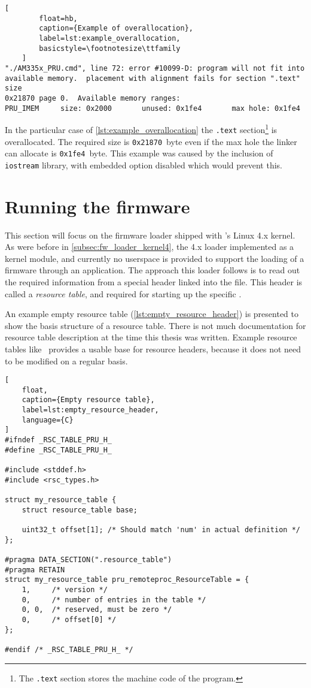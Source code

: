 \begin{lstlisting}[
		float=hb,
		caption={Example of overallocation},
		label=lst:example_overallocation,
		basicstyle=\footnotesize\ttfamily
	]
"./AM335x_PRU.cmd", line 72: error #10099-D: program will not fit into
available memory.  placement with alignment fails for section ".text" size
0x21870 page 0.  Available memory ranges:
PRU_IMEM     size: 0x2000       unused: 0x1fe4       max hole: 0x1fe4
\end{lstlisting}

In the particular case of \cref{lst:example_overallocation} the \verb|.text| section\footnote{The \verb|.text| section stores the machine code of the program.} is overallocated. The required size is \verb|0x21870|\ byte even if the max hole the linker can allocate is \verb|0x1fe4|\ byte. This example was caused by the inclusion of \verb|iostream| library, with embedded \cpp{} option disabled which would prevent this.

\section{Running the firmware}

This section will focus on the firmware loader shipped with \ti{}'s Linux 4.x kernel. As were before in \cref{subsec:fw_loader_kernel4}, the 4.x loader implemented as a kernel module, and currently no userspace \api{} is provided to support the loading of a \pru{} firmware through an application. The approach this loader follows is to read out the required information from a special header linked into the \elf{} file. This header is called a \emph{resource table}, and required for starting up the specific \pru{}.

An example empty resource table (\cref{lst:empty_resource_header}) is presented to show the basis structure of a resource table. There is not much documentation for resource table description at the time this thesis was written. Example resource tables like~\cite{RESOURCE_TABLE_0}\cite{RESOURCE_TABLE_1} provides a usable base for resource headers, because it does not need to be modified on a regular basis.

\begin{lstlisting}[
	float,
	caption={Empty resource table},
	label=lst:empty_resource_header,
	language={C}
]
#ifndef _RSC_TABLE_PRU_H_
#define _RSC_TABLE_PRU_H_

#include <stddef.h>
#include <rsc_types.h>

struct my_resource_table {
	struct resource_table base;

	uint32_t offset[1]; /* Should match 'num' in actual definition */
};

#pragma DATA_SECTION(".resource_table")
#pragma RETAIN
struct my_resource_table pru_remoteproc_ResourceTable = {
	1,     /* version */
	0,     /* number of entries in the table */
	0, 0,  /* reserved, must be zero */
	0,     /* offset[0] */
};

#endif /* _RSC_TABLE_PRU_H_ */
\end{lstlisting}

